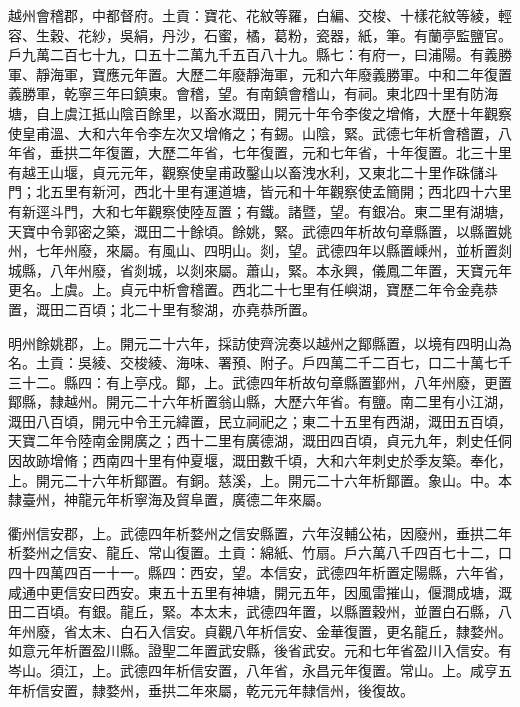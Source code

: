 \begin{pinyinscope}
 越州會稽郡，中都督府。土貢：寶花、花紋等羅，白編、交梭、十樣花紋等綾，輕容、生穀、花紗，吳絹，丹沙，石蜜，橘，葛粉，瓷器，紙，筆。有蘭亭監鹽官。戶九萬二百七十九，口五十二萬九千五百八十九。縣七：有府一，曰浦陽。有義勝軍、靜海軍，寶應元年置。大歷二年廢靜海軍，元和六年廢義勝軍。中和二年復置義勝軍，乾寧三年曰鎮東。會稽，望。有南鎮會稽山，有祠。東北四十里有防海塘，自上虞江抵山陰百餘里，以畜水溉田，開元十年令李俊之增脩，大歷十年觀察使皇甫溫、大和六年令李左次又增脩之；有錫。山陰，緊。武德七年析會稽置，八年省，垂拱二年復置，大歷二年省，七年復置，元和七年省，十年復置。北三十里有越王山堰，貞元元年，觀察使皇甫政鑿山以畜洩水利，又東北二十里作硃儲斗門；北五里有新河，西北十里有運道塘，皆元和十年觀察使孟簡開；西北四十六里有新逕斗門，大和七年觀察使陸亙置；有鐵。諸暨，望。有銀冶。東二里有湖塘，天寶中令郭密之築，溉田二十餘頃。餘姚，緊。武德四年析故句章縣置，以縣置姚州，七年州廢，來屬。有風山、四明山。剡，望。武德四年以縣置嵊州，並析置剡城縣，八年州廢，省剡城，以剡來屬。蕭山，緊。本永興，儀鳳二年置，天寶元年更名。上虞。上。貞元中析會稽置。西北二十七里有任嶼湖，寶歷二年令金堯恭置，溉田二百頃；北二十里有黎湖，亦堯恭所置。



 明州餘姚郡，上。開元二十六年，採訪使齊浣奏以越州之鄮縣置，以境有四明山為名。土貢：吳綾、交梭綾、海味、署預、附子。戶四萬二千二百七，口二十萬七千三十二。縣四：有上亭戍。鄮，上。武德四年析故句章縣置鄞州，八年州廢，更置鄮縣，隸越州。開元二十六年析置翁山縣，大歷六年省。有鹽。南二里有小江湖，溉田八百頃，開元中令王元緯置，民立祠祀之；東二十五里有西湖，溉田五百頃，天寶二年令陸南金開廣之；西十二里有廣德湖，溉田四百頃，貞元九年，刺史任侗因故跡增脩；西南四十里有仲夏堰，溉田數千頃，大和六年刺史於季友築。奉化，上。開元二十六年析鄮置。有銅。慈溪，上。開元二十六年析鄮置。象山。中。本隸臺州，神龍元年析寧海及貿阜置，廣德二年來屬。



 衢州信安郡，上。武德四年析婺州之信安縣置，六年沒輔公祐，因廢州，垂拱二年析婺州之信安、龍丘、常山復置。土貢：綿紙、竹扇。戶六萬八千四百七十二，口四十四萬四百一十一。縣四：西安，望。本信安，武德四年析置定陽縣，六年省，咸通中更信安曰西安。東五十五里有神塘，開元五年，因風雷摧山，偃澗成塘，溉田二百頃。有銀。龍丘，緊。本太末，武德四年置，以縣置穀州，並置白石縣，八年州廢，省太末、白石入信安。貞觀八年析信安、金華復置，更名龍丘，隸婺州。如意元年析置盈川縣。證聖二年置武安縣，後省武安。元和七年省盈川入信安。有岑山。須江，上。武德四年析信安置，八年省，永昌元年復置。常山。上。咸亨五年析信安置，隸婺州，垂拱二年來屬，乾元元年隸信州，後復故。




\end{pinyinscope}
